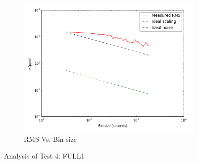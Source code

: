 \documentclass{aastex6}
\begin{document}
\begin{figure}[H]
    \begin{subfigure}{3}
        \includegraphics[scale=0.6]{rms_test4}
        \caption{RMS Vs. Bin size}
    \end{subfigure}
    \caption{Analysis of Test 4: FULL1}
\end{figure}
\end{document}
